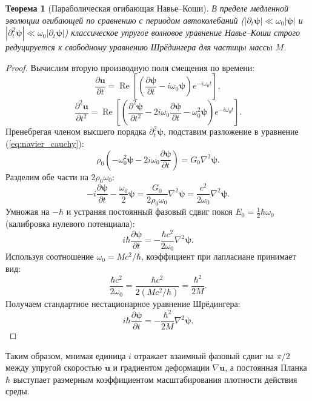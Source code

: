 \documentclass[11pt,a4paper]{article}
\newtheorem{theorem}{Теорема}
\theoremstyle{definition}
\theoremstyle{remark}
\begin{document}
\begin{theorem}[Параболическая огибающая Навье--Коши]
В пределе медленной эволюции огибающей по сравнению с периодом автоколебаний ($|\partial_t \boldsymbol{\psi}| \ll \omega_0 |\boldsymbol{\psi}|$ и $|\partial_t^2 \boldsymbol{\psi}| \ll \omega_0 |\partial_t \boldsymbol{\psi}|$) классическое упругое волновое уравнение Навье--Коши строго редуцируется к свободному уравнению Шрёдингера для частицы массы $M$.
\end{theorem}
\begin{proof}
Вычислим вторую производную поля смещения по времени:
\begin{equation}
    \frac{\partial \mathbf{u}}{\partial t} = \operatorname{Re}\left[ \left( \frac{\partial \boldsymbol{\psi}}{\partial t} - i\omega_0 \boldsymbol{\psi} \right) e^{-i\omega_0 t} \right],
\end{equation}
\begin{equation}
    \frac{\partial^2 \mathbf{u}}{\partial t^2} = \operatorname{Re}\left[ \left( \frac{\partial^2 \boldsymbol{\psi}}{\partial t^2} - 2i\omega_0 \frac{\partial \boldsymbol{\psi}}{\partial t} - \omega_0^2 \boldsymbol{\psi} \right) e^{-i\omega_0 t} \right].
\end{equation}
Пренебрегая членом высшего порядка $\partial_t^2 \boldsymbol{\psi}$, подставим разложение в уравнение (\ref{eq:navier_cauchy}):
\begin{equation}
    \rho_0 \left( -\omega_0^2 \boldsymbol{\psi} - 2i\omega_0 \frac{\partial \boldsymbol{\psi}}{\partial t} \right) = G_0 \nabla^2 \boldsymbol{\psi}.
\end{equation}
Разделим обе части на $2\rho_0 \omega_0$:
\begin{equation}
    -i \frac{\partial \boldsymbol{\psi}}{\partial t} - \frac{\omega_0}{2} \boldsymbol{\psi} = \frac{G_0}{2\rho_0 \omega_0} \nabla^2 \boldsymbol{\psi} = \frac{c^2}{2\omega_0} \nabla^2 \boldsymbol{\psi}.
\end{equation}
Умножая на $-\hbar$ и устраняя постоянный фазовый сдвиг покоя $E_0 = \frac{1}{2}\hbar\omega_0$ (калибровка нулевого потенциала):
\begin{equation}
    i\hbar \frac{\partial \boldsymbol{\psi}}{\partial t} = -\frac{\hbar c^2}{2\omega_0} \nabla^2 \boldsymbol{\psi}.
\end{equation}
Используя соотношение $\omega_0 = M c^2 / \hbar$, коэффициент при лапласиане принимает вид:
\begin{equation}
    \frac{\hbar c^2}{2\omega_0} = \frac{\hbar c^2}{2 (M c^2 / \hbar)} = \frac{\hbar^2}{2M}.
\end{equation}
Получаем стандартное нестационарное уравнение Шрёдингера:
\begin{equation}
    i\hbar \frac{\partial \boldsymbol{\psi}}{\partial t} = -\frac{\hbar^2}{2M} \nabla^2 \boldsymbol{\psi}.
\end{equation}
\end{proof}
Таким образом, мнимая единица $i$ отражает взаимный фазовый сдвиг на $\pi/2$ между упругой скоростью $\dot{\mathbf{u}}$ и градиентом деформации $\nabla \mathbf{u}$, а постоянная Планка $\hbar$ выступает размерным коэффициентом масштабирования плотности действия среды.
\end{document}

